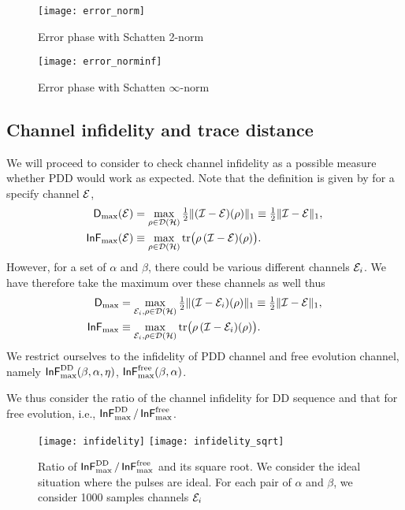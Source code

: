 \documentclass[aps,pra,reprint,superscriptaddress]{revtex4-2}
\begin{document}
\begin{figure}
    \centering
    \texttt{[image: error\_norm]}
    \caption{Error phase with Schatten 2-norm} 
    \label{fig:pdd-region-check-norm}
\end{figure}

\begin{figure}
    \centering
    \texttt{[image: error\_norminf]}
    \caption{Error phase with Schatten $\infty$-norm} 
    \label{fig:pdd-region-check-norm}
\end{figure}

\subsection{Channel infidelity and trace distance}
We will proceed to consider to check channel infidelity as a possible measure whether PDD would work as expected. Note that the definition is given by for a specify channel $\mathcal{E}$,
\begin{align}
\operatorname{\mathsf{D}}_{\max}(\mathcal{E}) &= \max_{\rho\in\mathcal{D}(\mathcal{H})} \tfrac{1}{2} \Vert { (\mathcal{I}-\mathcal{E}) (\rho)} \Vert_1 \equiv \tfrac{1}{2} \Vert { \mathcal{I}-\mathcal{E}} \Vert_1, \\
\operatorname{\mathsf{InF}}_{\max}(\mathcal{E}) &\equiv \max_{\rho\in\mathcal{D}(\mathcal{H})} \operatorname{tr}\bigl(\rho\, (\mathcal{I} -\mathcal{E})(\rho)\bigr).
\end{align}
However, for a set of $\alpha$ and $\beta$, there could be various different channels ${\mathcal{E}}_i$. We have therefore take the maximum over these channels as well thus  
\begin{align}
    \operatorname{\mathsf{D}}_{\max} &= \max_{{\mathcal{E}}_i, \rho\in\mathcal{D}(\mathcal{H})} \tfrac{1}{2} \Vert { (\mathcal{I}- {\mathcal{E}}_{i}) (\rho)} \Vert_1 \equiv \tfrac{1}{2} \Vert { \mathcal{I}-\mathcal{E}} \Vert_1, \\
    \operatorname{\mathsf{InF}}_{\max} &\equiv \max_{ {\mathcal{E}}_i,\rho\in\mathcal{D}(\mathcal{H})} \operatorname{tr}\bigl(\rho\, (\mathcal{I} -{\mathcal{E}}_{i})(\rho)\bigr).
\end{align}
We restrict ourselves to the infidelity of PDD channel and free evolution channel, namely $\operatorname{\mathsf{InF}}^{\rm DD}_{\rm max}(\beta, \alpha, \eta)$,  $\operatorname{\mathsf{InF}}^{\rm free}_{\rm max}(\beta, \alpha)$. 


We thus consider the ratio of the channel infidelity for DD sequence and that for free evolution, i.e., $\operatorname{\mathsf{InF}}^{\rm DD}_{\rm max} / \operatorname{\mathsf{InF}}^{\rm free}_{\rm max}$. 

\begin{figure}
    \centering
    \texttt{[image: infidelity]}
    \texttt{[image: infidelity\_sqrt]}
    \caption{Ratio of $\operatorname{\mathsf{InF}}^{\rm DD}_{\rm max} / \operatorname{\mathsf{InF}}^{\rm free}_{\rm max}$ and its square root. We consider the ideal situation where the pulses are ideal. For each pair of $\alpha$ and $\beta$, we consider 1000 samples channels ${\mathcal{E}}_i$} 
    \label{fig:pdd-region-fidelity}
\end{figure}
\end{document}
